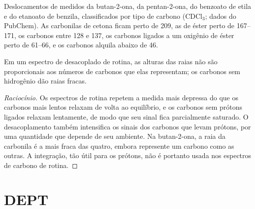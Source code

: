 \begin{omfigure}

{\small Deslocamentos de  medidos da butan-2-ona, da pentan-2-ona, do benzoato de etila e do
etanoato de benzila, classificados por tipo de carbono (CDCl$_3$; dados do PubChem). As carbonilas de
cetona ficam perto de 209, as de éster perto de 167--171, os carbonos  entre 128 e 137, os
carbonos ligados a um oxigênio de éster perto de 61--66, e os carbonos alquila abaixo de 46.}
\end{omfigure}

\begin{proposition}\label{prop:b2:structure-determination:intensities}
Em um espectro de  desacoplado de rotina, as alturas das raias não são proporcionais aos
números de carbonos que elas representam; os carbonos sem hidrogênio dão raias fracas.
\end{proposition}

\begin{proof}[Raciocínio]
Os espectros de rotina repetem a medida mais depressa do que os carbonos mais lentos relaxam de volta ao
equilíbrio, e os carbonos sem prótons ligados relaxam lentamente, de modo que seu sinal fica parcialmente
saturado. O desacoplamento também intensifica os sinais dos carbonos que levam prótons, por uma
quantidade que depende de seu ambiente. Na butan-2-ona, a raia da carbonila é a mais fraca das quatro,
embora represente um carbono como as outras. A integração, tão útil para os prótons, não é portanto
usada nos espectros de carbono de rotina.
\end{proof}

\section{DEPT}

